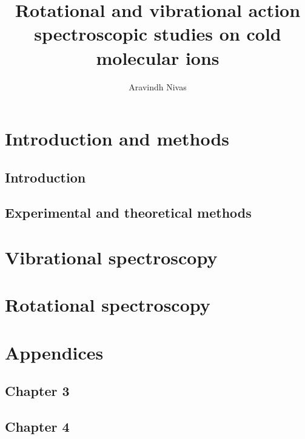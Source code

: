\documentclass[fourier]{_style/dissertation}
\title{Rotational and vibrational action spectroscopic studies on cold molecular ions}
\author{Aravindh Nivas}{Marimuthu}
\begin{document}
\frontmatter




\dedication{\emph{To my family and teachers.}}

{
  \cleardoublepage%

  \tableofcontents

  \cleardoublepage%
}

\mainmatter

\part{Introduction and methods}
\chapter{Introduction}\label{chapter:intro}


\chapter{Experimental and theoretical methods}\label{chapter:methods}


\part{Vibrational spectroscopy}




\part{Rotational spectroscopy}



\appendix
\cleardoublepage%
%
\part*{Appendices}
\chapter{Chapter 3}


\chapter{Chapter 4}

\end{document}

